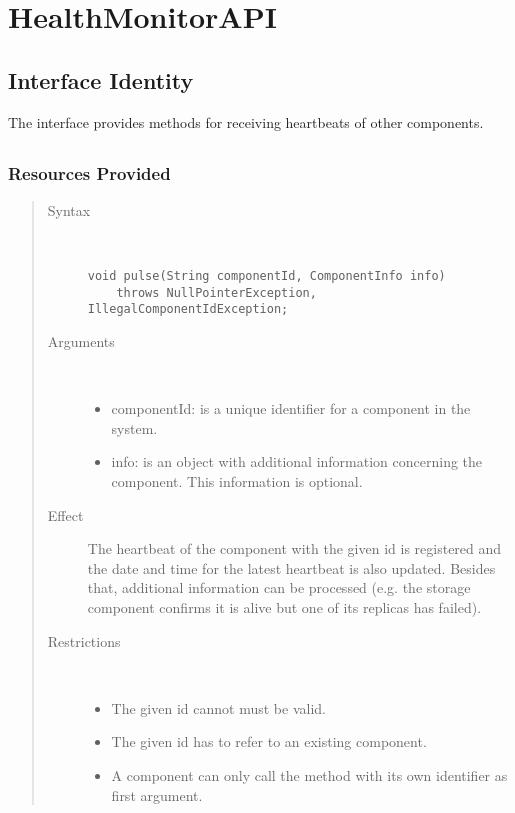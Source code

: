 \section{HealthMonitorAPI}
\label{api:health-monitoring-unit-api}

\subsection{Interface Identity}

\npar The  interface provides methods for
receiving heartbeats of other components.

\subsection{}

\subsubsection{Resources Provided}

\begin{quote}
	\begin{description}
		\item[Syntax] \
		\begin{verbatim}
void pulse(String componentId, ComponentInfo info)
    throws NullPointerException, IllegalComponentIdException;
		\end{verbatim}
		\item[Arguments] \
		\begin{itemize}
		  \item componentId: is a unique identifier for a component in the system.
		  \item info: is an object with additional information concerning the
		  component. This information is optional.
		\end{itemize}
		\item[Effect] The heartbeat of the component with the given id is registered
		and the date and time for the latest heartbeat is also updated. Besides that,
		additional information can be processed (e.g. the storage component confirms
		it is alive but one of its replicas has failed).
		\item[Restrictions] \
		\begin{itemize}
		  \item The given id cannot must be valid.
		  \item The given id has to refer to an existing component.
		  \item A component can only call the  method with its own
		  identifier as first argument. 
		\end{itemize}
	\end{description} 
\end{quote}

